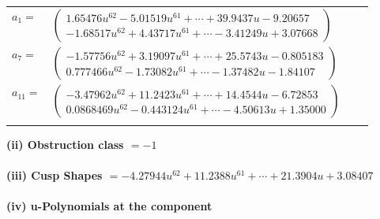 \documentclass[1p]{elsarticle_modified}
\theoremstyle{definition}
\begin{document}
\begin{tabular}{m{7pt} m{180pt} m{7pt} m{180pt} }
\flushright $a_{1}=$&$\begin{pmatrix}1.65476 u^{62}-5.01519 u^{61}+\cdots+39.9437 u-9.20657\\-1.68517 u^{62}+4.43717 u^{61}+\cdots-3.41249 u+3.07668\end{pmatrix}$ \\
\flushright $a_{7}=$&$\begin{pmatrix}-1.57756 u^{62}+3.19097 u^{61}+\cdots+25.5743 u-0.805183\\0.777466 u^{62}-1.73082 u^{61}+\cdots-1.37482 u-1.84107\end{pmatrix}$ \\
\flushright $a_{11}=$&$\begin{pmatrix}-3.47962 u^{62}+11.2423 u^{61}+\cdots+14.4544 u-6.72853\\0.0868469 u^{62}-0.443124 u^{61}+\cdots-4.50613 u+1.35000\end{pmatrix}$\\&\end{tabular}
\flushleft \textbf{(ii) Obstruction class $= -1$}\\~\\
\flushleft \textbf{(iii) Cusp Shapes $= -4.27944 u^{62}+11.2388 u^{61}+\cdots+21.3904 u+3.08407$}\\~\\
\newpage\renewcommand{\arraystretch}{1}
\flushleft \textbf{(iv) u-Polynomials at the component}\newline \\
\end{document}
